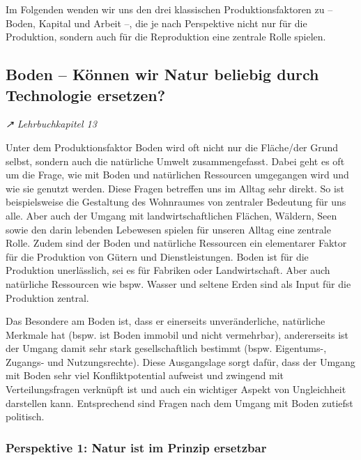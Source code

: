 \documentclass[
  nswissgerman,
  a4paper,
  DIV=11,
  numbers=noendperiod,
  oneside,
  openany]{scrreprt}
\begin{document}
Im Folgenden wenden wir uns den drei klassischen Produktionsfaktoren zu
-- Boden, Kapital und Arbeit --, die je nach Perspektive nicht nur für
die Produktion, sondern auch für die Reproduktion eine zentrale Rolle
spielen.

\subsection{Boden -- Können wir Natur beliebig durch Technologie
ersetzen?}\label{boden-kuxf6nnen-wir-natur-beliebig-durch-technologie-ersetzen}

\emph{↗ Lehrbuchkapitel 13}

Unter dem Produktionsfaktor Boden wird oft nicht nur die Fläche/der
Grund selbst, sondern auch die natürliche Umwelt zusammengefasst. Dabei
geht es oft um die Frage, wie mit Boden und natürlichen Ressourcen
umgegangen wird und wie sie genutzt werden. Diese Fragen betreffen uns
im Alltag sehr direkt. So ist beispielsweise die Gestaltung des
Wohnraumes von zentraler Bedeutung für uns alle. Aber auch der Umgang
mit landwirtschaftlichen Flächen, Wäldern, Seen sowie den darin lebenden
Lebewesen spielen für unseren Alltag eine zentrale Rolle. Zudem sind der
Boden und natürliche Ressourcen ein elementarer Faktor für die
Produktion von Gütern und Dienstleistungen. Boden ist für die Produktion
unerlässlich, sei es für Fabriken oder Landwirtschaft. Aber auch
natürliche Ressourcen wie bspw. Wasser und seltene Erden sind als Input
für die Produktion zentral.

Das Besondere am Boden ist, dass er einerseits unveränderliche,
natürliche Merkmale hat (bspw. ist Boden immobil und nicht vermehrbar),
andererseits ist der Umgang damit sehr stark gesellschaftlich bestimmt
(bspw. Eigentums-, Zugangs- und Nutzungsrechte). Diese Ausgangslage
sorgt dafür, dass der Umgang mit Boden sehr viel Konfliktpotential
aufweist und zwingend mit Verteilungsfragen verknüpft ist und auch ein
wichtiger Aspekt von Ungleichheit darstellen kann. Entsprechend sind
Fragen nach dem Umgang mit Boden zutiefst politisch.

\subsubsection{Perspektive 1: Natur ist im Prinzip
ersetzbar}\label{perspektive-1-natur-ist-im-prinzip-ersetzbar}
\end{document}

